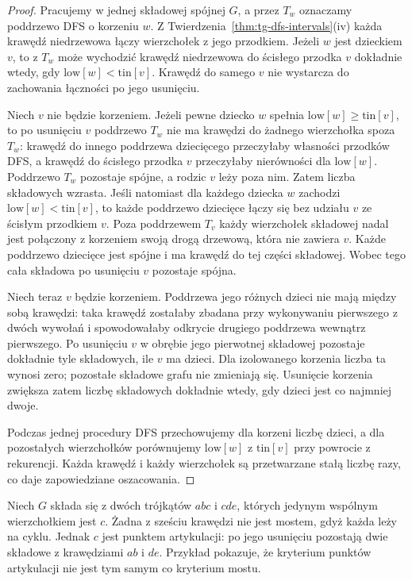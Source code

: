 \begin{proof}
Pracujemy w jednej składowej spójnej $G$,
a przez $T_w$ oznaczamy poddrzewo DFS
o korzeniu $w$. Z
Twierdzenia~\ref{thm:tg-dfs-intervals}(iv)
każda krawędź niedrzewowa łączy
wierzchołek z jego przodkiem.
Jeżeli $w$ jest dzieckiem $v$,
to z $T_w$ może wychodzić krawędź
niedrzewowa do ścisłego przodka $v$
dokładnie wtedy, gdy
$\mathrm{low}[w]<\mathrm{tin}[v]$.
Krawędź do samego $v$ nie wystarcza
do zachowania łączności po jego usunięciu.

Niech $v$ nie będzie korzeniem.
Jeżeli pewne dziecko $w$ spełnia
$\mathrm{low}[w]\geq\mathrm{tin}[v]$,
to po usunięciu $v$ poddrzewo $T_w$
nie ma krawędzi do żadnego wierzchołka spoza $T_w$:
krawędź do innego poddrzewa dziecięcego przeczyłaby
własności przodków DFS, a krawędź do ścisłego przodka $v$
przeczyłaby nierówności dla $\mathrm{low}[w]$.
Poddrzewo $T_w$ pozostaje spójne, a rodzic $v$ leży
poza nim. Zatem liczba składowych wzrasta.
Jeśli natomiast dla każdego dziecka
$w$ zachodzi
$\mathrm{low}[w]<\mathrm{tin}[v]$,
to każde poddrzewo dziecięce
łączy się bez udziału $v$ ze ścisłym
przodkiem $v$. Poza poddrzewem $T_v$ każdy wierzchołek składowej
nadal jest połączony z korzeniem swoją drogą drzewową,
która nie zawiera $v$. Każde poddrzewo dziecięce
jest spójne i ma krawędź do tej części składowej.
Wobec tego cała składowa po usunięciu $v$ pozostaje spójna.

Niech teraz $v$ będzie korzeniem.
Poddrzewa jego różnych dzieci
nie mają między sobą krawędzi:
taka krawędź zostałaby zbadana
przy wykonywaniu pierwszego z
dwóch wywołań i spowodowałaby
odkrycie drugiego poddrzewa
wewnątrz pierwszego. Po usunięciu
$v$ w obrębie jego pierwotnej składowej pozostaje
dokładnie tyle składowych, ile $v$ ma dzieci.
Dla izolowanego korzenia liczba ta wynosi zero;
pozostałe składowe grafu nie zmieniają się.
Usunięcie korzenia zwiększa zatem
liczbę składowych dokładnie wtedy,
gdy dzieci jest co najmniej dwoje.

Podczas jednej procedury DFS
przechowujemy dla korzeni
liczbę dzieci, a dla pozostałych
wierzchołków porównujemy
$\mathrm{low}[w]$ z $\mathrm{tin}[v]$
przy powrocie z rekurencji.
Każda krawędź i każdy wierzchołek
są przetwarzane stałą liczbę razy,
co daje zapowiedziane oszacowania.
\end{proof}

\begin{przyklad}
\label{ex:tg-dfs-articulation}
Niech $G$ składa się z dwóch trójkątów
$abc$ i $cde$, których jedynym wspólnym
wierzchołkiem jest $c$.
Żadna z sześciu krawędzi nie jest mostem,
gdyż każda leży na cyklu. Jednak $c$
jest punktem artykulacji: po jego usunięciu
pozostają dwie składowe z krawędziami
$ab$ i $de$. Przykład pokazuje, że
kryterium punktów artykulacji nie jest
tym samym co kryterium mostu.
\end{przyklad}

